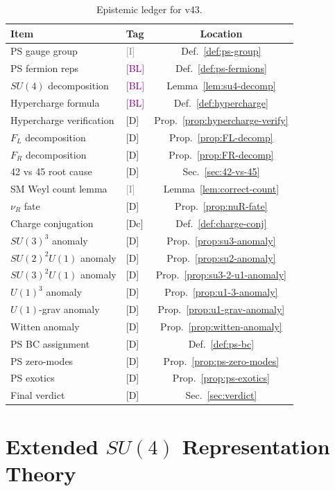 \documentclass[11pt,a4paper]{article}
\newcommand{\tagD}{\textcolor{blue!70!black}{[D]}}
\newcommand{\tagDc}{\textcolor{blue!50!black}{[Dc]}}
\newcommand{\tagI}{\textcolor{gray}{[I]}}
\newcommand{\tagBL}{\textcolor{purple}{[BL]}}
\begin{document}
\begin{table}[h]
\centering
\caption{Epistemic ledger for v43.}
\label{tab:ledger}
\begin{tabular}{llc}
\toprule
Item & Tag & Location \\
\midrule
PS gauge group & \tagI & Def.~\ref{def:ps-group} \\
PS fermion reps & \tagBL & Def.~\ref{def:ps-fermions} \\
$SU(4)$ decomposition & \tagBL & Lemma~\ref{lem:su4-decomp} \\
Hypercharge formula & \tagBL & Def.~\ref{def:hypercharge} \\
Hypercharge verification & \tagD & Prop.~\ref{prop:hypercharge-verify} \\
$F_L$ decomposition & \tagD & Prop.~\ref{prop:FL-decomp} \\
$F_R$ decomposition & \tagD & Prop.~\ref{prop:FR-decomp} \\
42 vs 45 root cause & \tagD & Sec.~\ref{sec:42-vs-45} \\
SM Weyl count lemma & \tagI & Lemma~\ref{lem:correct-count} \\
$\nu_R$ fate & \tagD & Prop.~\ref{prop:nuR-fate} \\
Charge conjugation & \tagDc & Def.~\ref{def:charge-conj} \\
$SU(3)^3$ anomaly & \tagD & Prop.~\ref{prop:su3-anomaly} \\
$SU(2)^2 U(1)$ anomaly & \tagD & Prop.~\ref{prop:su2-anomaly} \\
$SU(3)^2 U(1)$ anomaly & \tagD & Prop.~\ref{prop:su3-2-u1-anomaly} \\
$U(1)^3$ anomaly & \tagD & Prop.~\ref{prop:u1-3-anomaly} \\
$U(1)$-grav anomaly & \tagD & Prop.~\ref{prop:u1-grav-anomaly} \\
Witten anomaly & \tagD & Prop.~\ref{prop:witten-anomaly} \\
PS BC assignment & \tagD & Def.~\ref{def:ps-bc} \\
PS zero-modes & \tagD & Prop.~\ref{prop:ps-zero-modes} \\
PS exotics & \tagD & Prop.~\ref{prop:ps-exotics} \\
Final verdict & \tagD & Sec.~\ref{sec:verdict} \\
\bottomrule
\end{tabular}
\end{table}

\section{Extended $SU(4)$ Representation Theory}
\label{app:su4}
\end{document}
